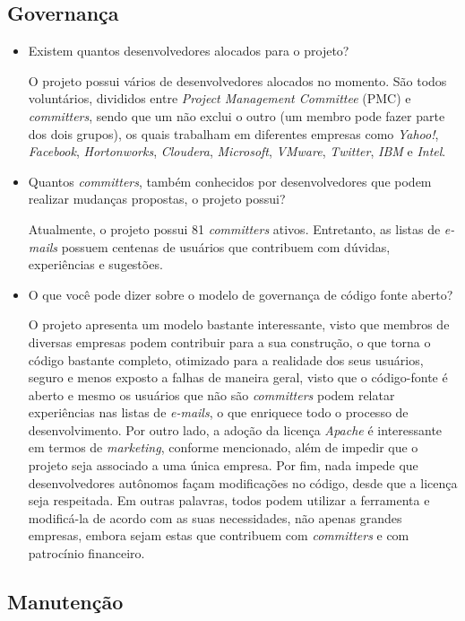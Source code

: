 \documentclass[12pt,a4paper]{article} %
\begin{document}
\subsection{Governança}


\begin{itemize}
\item Existem quantos desenvolvedores alocados para o projeto?

O projeto possui vários de desenvolvedores alocados no momento. São todos voluntários, divididos entre \emph{Project Management Committee} (PMC) e \emph{committers}, sendo que um não exclui o outro (um membro pode fazer parte dos dois grupos), os quais trabalham em diferentes empresas como \emph{Yahoo!}, \emph{Facebook}, \emph{Hortonworks}, \emph{Cloudera}, \emph{Microsoft}, \emph{VMware}, \emph{Twitter}, \emph{IBM} e \emph{Intel}.

\item Quantos \textit{committers}, também conhecidos por desenvolvedores que podem realizar mudanças propostas, o projeto possui?

Atualmente, o projeto possui 81 \emph{committers} ativos. Entretanto, as listas de \emph{e-mails} possuem centenas de usuários que contribuem com dúvidas, experiências e sugestões.

\item O que você pode dizer sobre o modelo de governança de código fonte aberto?

O projeto apresenta um modelo bastante interessante, visto que membros de diversas empresas podem contribuir para a sua construção, o que torna o código bastante completo, otimizado para a realidade dos seus usuários, seguro e menos exposto a falhas de maneira geral, visto que o código-fonte é aberto e mesmo os usuários que não são \emph{committers} podem relatar experiências nas listas de \emph{e-mails}, o que enriquece todo o processo de desenvolvimento. Por outro lado, a adoção da licença \emph{Apache} é interessante em termos de \emph{marketing}, conforme mencionado, além de impedir que o projeto seja associado a uma única empresa. Por fim, nada impede que desenvolvedores autônomos façam modificações no código, desde que a licença seja respeitada. Em outras palavras, todos podem utilizar a ferramenta e modificá-la de acordo com as suas necessidades, não apenas grandes empresas, embora sejam estas que contribuem com \emph{committers} e com patrocínio financeiro.
\end{itemize}

\subsection{Manutenção}
\end{document}
